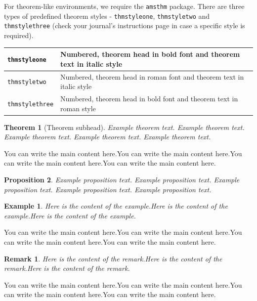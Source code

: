 \documentclass[namedate,webpdf,contemporary,large]{TBench-template}%
\theoremstyle{thmstyleone}%
\newtheorem{theorem}{Theorem}%
\newtheorem{proposition}[theorem]{Proposition}%
\theoremstyle{thmstyletwo}%
\newtheorem{example}{Example}%
\newtheorem{remark}{Remark}%
\theoremstyle{thmstylethree}%
\begin{document}
For theorem-like environments, we require the \verb+amsthm+ package. There are three types of predefined theorem styles - \verb+thmstyleone+, \verb+thmstyletwo+ and \verb+thmstylethree+   (check your journal's instructions page in case a specific style is required).

\medskip
\noindent\begin{tabular}{|l|p{13pc}|}
\hline
\verb+thmstyleone+ & Numbered, theorem head in bold font and theorem text in italic style \\\hline
\verb+thmstyletwo+ & Numbered, theorem head in roman font and theorem text in italic style \\\hline
\verb+thmstylethree+ & Numbered, theorem head in bold font and theorem text in roman style \\\hline
\end{tabular}


\begin{theorem}[Theorem subhead]\label{thm1}
Example theorem text. Example theorem text. Example theorem text. Example theorem text. Example theorem text.
\end{theorem}

You can write the main content here.You can write the main content here.You can write the main content here.You can write the main content here.

\begin{proposition}
Example proposition text. Example proposition text. Example proposition text. Example proposition text. Example proposition text.
\end{proposition}



\begin{example}
Here is the content of the example.Here is the content of the example.Here is the content of the example.
\end{example}

You can write the main content here.You can write the main content here.You can write the main content here.You can write the main content here.

\begin{remark}
Here is the content of the remark.Here is the content of the remark.Here is the content of the remark.
\end{remark}

You can write the main content here.You can write the main content here.You can write the main content here.You can write the main content here.
\end{document}
